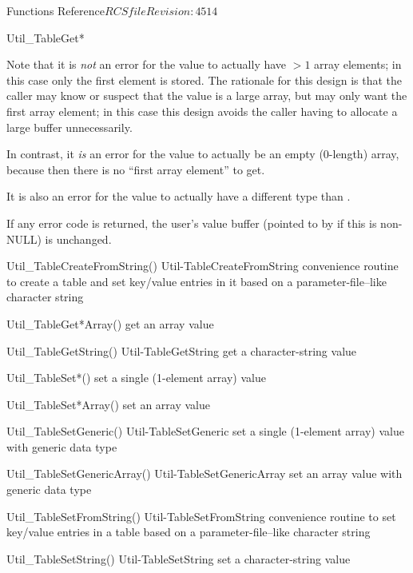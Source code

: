 \begin{cactuspart}{ Functions Reference}{$RCSfile$}{$Revision: 4514 $}
\begin{FunctionDescription}{Util\_TableGet*}
\begin{Discussion}
Note that it is {\em not\/} an error for the value to actually have
$> 1$ array elements; in this case only the first element is stored.
The rationale for this design is that the caller may know or suspect
that the value is a large array, but may only want the first array
element; in this case this design avoids the caller having to allocate
a large buffer unnecessarily.

In contrast, it {\em is\/} an error for the value to actually be an
empty (0-length) array, because then there is no ``first array element''
to get.

It is also an error for the value to actually have a different type
than .

If any error code is returned, the user's value buffer
(pointed to by  if this is non-NULL) is unchanged.
\end{Discussion}

\begin{SeeAlsoSection}
\begin{SeeAlso2} {Util\_TableCreateFromString()} {Util-TableCreateFromString}
convenience routine to create a table and set key/value entries
in it based on a parameter-file--like character string
\end{SeeAlso2}
\begin{SeeAlso}{Util\_TableGet*Array()}
get an array value
\end{SeeAlso}
\begin{SeeAlso2} {Util\_TableGetString()} {Util-TableGetString}
get a character-string value
\end{SeeAlso2}
\begin{SeeAlso}{Util\_TableSet*()}
set a single (1-element array) value
\end{SeeAlso}
\begin{SeeAlso}{Util\_TableSet*Array()}
set an array value
\end{SeeAlso}
\begin{SeeAlso2} {Util\_TableSetGeneric()} {Util-TableSetGeneric}
set a single (1-element array) value with generic data type
\end{SeeAlso2}
\begin{SeeAlso2} {Util\_TableSetGenericArray()} {Util-TableSetGenericArray}
set an array value with generic data type
\end{SeeAlso2}
\begin{SeeAlso2} {Util\_TableSetFromString()} {Util-TableSetFromString}
convenience routine to set key/value entries in a table based on a
parameter-file--like character string
\end{SeeAlso2}
\begin{SeeAlso2} {Util\_TableSetString()} {Util-TableSetString}
set a character-string value
\end{SeeAlso2}
\end{SeeAlsoSection}


\end{FunctionDescription}
\end{cactuspart}
